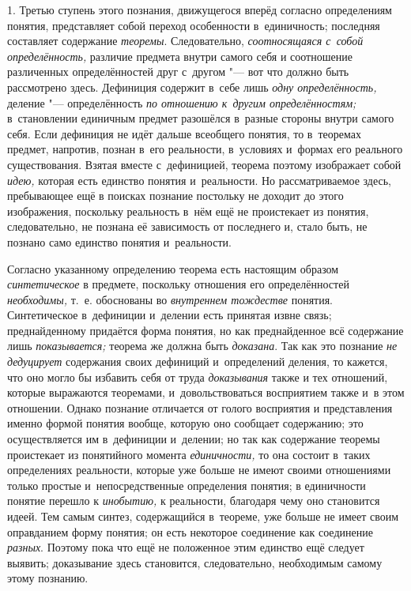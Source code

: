 1. Третью ступень этого познания, движущегося вперёд согласно
определениям понятия, представляет собой переход особенности в~единичность;
последняя составляет содержание {\em теоремы}. Следовательно,
{\em соотносящаяся с~собой
определённость,} различие предмета внутри самого себя и
соотношение различенных определённостей друг с~другом "--- вот
что должно быть рассмотрено здесь. Дефиниция содержит в~себе лишь
{\em одну определённость,} деление "--- определённость {\em по отношению
к~другим определённостям;} в~становлении единичным предмет разошёлся
в~разные стороны внутри самого себя. Если дефиниция не идёт дальше
всеобщего понятия, то в~теоремах предмет, напротив, познан в~его
реальности, в~условиях и~формах его реального существования. Взятая вместе
с~дефиницией, теорема поэтому изображает собой
{\em идею,} которая есть
единство понятия и~реальности. Но рассматриваемое здесь, пребывающее ещё в
поисках познание постольку не доходит до этого изображения, поскольку
реальность в~нём ещё не проистекает из понятия, следовательно, не познана
её зависимость от последнего и, стало быть, не познано само единство
понятия и~реальности.

Согласно указанному определению теорема есть настоящим образом
{\em синтетическое} в
предмете, поскольку отношения его определённостей
{\em необходимы,} т.~е.
обоснованы во {\em внутреннем
тождестве} понятия. Синтетическое в~дефиниции и~делении есть
принятая извне связь; преднайденному придаётся форма понятия, но как
преднайденное всё содержание лишь
{\em показывается;}
теорема же должна быть
{\em доказана}. Так как
это познание {\em не дедуцирует}
содержания своих дефиниций и~определений деления, то кажется,
что оно могло бы избавить себя от труда
{\em доказывания} также и
тех отношений, которые выражаются теоремами, и~довольствоваться восприятием
также и~в этом отношении. Однако познание отличается от голого восприятия и
представления именно формой понятия вообще, которую оно сообщает
содержанию; это осуществляется им в~дефиниции и~делении; но так как
содержание теоремы проистекает из понятийного момента
{\em единичности,} то она
состоит в~таких определениях реальности, которые уже больше не имеют своими
отношениями только простые и~непосредственные определения понятия; в
единичности понятие перешло к
{\em инобытию,} к
реальности, благодаря чему оно становится идеей. Тем самым синтез,
содержащийся в~теореме, уже больше не имеет своим оправданием форму
понятия; он есть некоторое соединение как соединение
{\em разных}. Поэтому
пока что ещё не положенное этим единство ещё следует выявить; доказывание
здесь становится, следовательно, необходимым самому этому познанию.

